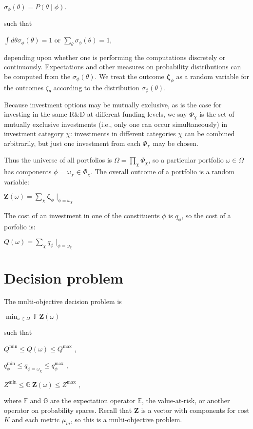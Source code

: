 \documentclass[letterpaper,10pt,english]{sphinxmanual}
\begin{document}
\(\sigma_\phi(\theta) = P\left(\theta \middle| \phi\right)\).

such that

\(\int d\theta \sigma_\phi(\theta) = 1\) or
\(\sum_\theta \sigma_\phi(\theta) = 1\),

depending upon whether one is performing the computations discretely or
continuously. Expectations and other measures on probability
distributions can be computed from the \(\sigma_\phi(\theta)\). We
treat the outcome \(\mathbf{\zeta}_\phi\) as a random variable for
the outcomes \(\zeta_\theta\) according to the distribution
\(\sigma_\phi(\theta)\).

Because investment options may be mutually exclusive, as is the case for
investing in the same R\&D at different funding levels, we say
\(\Phi_\chi\) is the set of mutually exclusive investments (i.e.,
only one can occur simultaneously) in investment category \(\chi\):
investments in different categories \(\chi\) can be combined
arbitrarily, but just one investment from each \(\Phi_\chi\) may be
chosen.

Thus the universe of all portfolios is
\(\Omega = \prod_\chi \Phi_\chi\), so a particular portfolio
\(\omega \in \Omega\) has components
\(\phi = \omega_\chi \in \Phi_\chi\). The overall outcome of a
portfolio is a random variable:

\(\mathbf{Z}(\omega) = \sum_\chi \mathbf{\zeta}_\phi \mid_{\phi = \omega_\chi}\)

The cost of an investment in one of the constituents \(\phi\) is
\(q_\phi\), so the cost of a porfolio is:

\(Q(\omega) = \sum_\chi q_\phi \mid_{\phi = \omega_\chi}\)


\section{Decision problem}
\label{\detokenize{formulation:decision-problem}}
The multi-objective decision problem is

\(\min_{\omega \in \Omega} \  \mathbb{F} \  \mathbf{Z}(\omega)\)

such that

\(Q^\mathrm{min} \leq Q(\omega) \leq Q^\mathrm{max}\) ,

\(q^\mathrm{min}_\phi \leq q_{\phi=\omega_\chi} \leq q^\mathrm{max}_\phi\)
,

\(Z^\mathrm{min} \leq \mathbb{G} \  \mathbf{Z}(\omega) \leq Z^\mathrm{max}\)
,

where \(\mathbb{F}\) and \(\mathbb{G}\) are the expectation
operator \(\mathbb{E}\), the value-at-risk, or another operator on
probability spaces. Recall that \(\mathbf{Z}\) is a vector with
components for cost \(K\) and each metric \(\mu_m\), so this is
a multi-objective problem.
\end{document}

